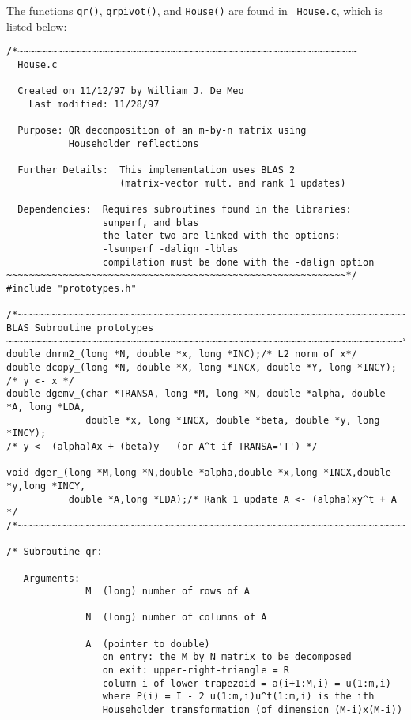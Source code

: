 \documentclass{article}
\begin{document}
The functions {\tt qr()}, {\tt qrpivot()}, and {\tt House()} are found in {\tt
  House.c}, which is listed below:
\begin{verbatim}
/*~~~~~~~~~~~~~~~~~~~~~~~~~~~~~~~~~~~~~~~~~~~~~~~~~~~~~~~~~~~~
  House.c

  Created on 11/12/97 by William J. De Meo
    Last modified: 11/28/97

  Purpose: QR decomposition of an m-by-n matrix using
           Householder reflections
           
  Further Details:  This implementation uses BLAS 2
                    (matrix-vector mult. and rank 1 updates)

  Dependencies:  Requires subroutines found in the libraries:
                 sunperf, and blas
                 the later two are linked with the options:
                 -lsunperf -dalign -lblas
                 compilation must be done with the -dalign option
~~~~~~~~~~~~~~~~~~~~~~~~~~~~~~~~~~~~~~~~~~~~~~~~~~~~~~~~~~~~*/
#include "prototypes.h"

/*~~~~~~~~~~~~~~~~~~~~~~~~~~~~~~~~~~~~~~~~~~~~~~~~~~~~~~~~~~~~~~~~~~~~~~
BLAS Subroutine prototypes                                            
~~~~~~~~~~~~~~~~~~~~~~~~~~~~~~~~~~~~~~~~~~~~~~~~~~~~~~~~~~~~~~~~~~~~~~*/
double dnrm2_(long *N, double *x, long *INC);/* L2 norm of x*/
double dcopy_(long *N, double *X, long *INCX, double *Y, long *INCY); /* y <- x */
double dgemv_(char *TRANSA, long *M, long *N, double *alpha, double *A, long *LDA, 
              double *x, long *INCX, double *beta, double *y, long *INCY);
/* y <- (alpha)Ax + (beta)y   (or A^t if TRANSA='T') */

void dger_(long *M,long *N,double *alpha,double *x,long *INCX,double *y,long *INCY,
           double *A,long *LDA);/* Rank 1 update A <- (alpha)xy^t + A */
/*~~~~~~~~~~~~~~~~~~~~~~~~~~~~~~~~~~~~~~~~~~~~~~~~~~~~~~~~~~~~~~~~~~~~~~*/

/* Subroutine qr:

   Arguments: 
              M  (long) number of rows of A

              N  (long) number of columns of A

              A  (pointer to double) 
                 on entry: the M by N matrix to be decomposed
                 on exit: upper-right-triangle = R
                 column i of lower trapezoid = a(i+1:M,i) = u(1:m,i)
                 where P(i) = I - 2 u(1:m,i)u^t(1:m,i) is the ith
                 Householder transformation (of dimension (M-i)x(M-i))


\end{verbatim}
\end{document}
